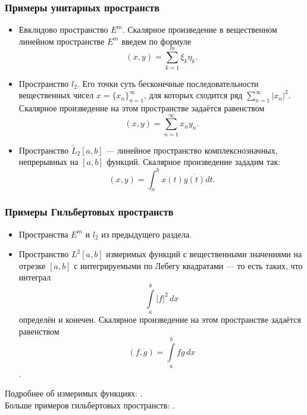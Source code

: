\subsubsection*{Примеры унитарных пространств}
\begin{itemize}
	\itemsep0pt
	\item Евклидово пространство $E^m$. Скалярное произведение в вещественном линейном пространстве $E^m$ введем по формуле
	$$(x, y) = \sum_{k = 1}^{m}\xi_k\eta_k.$$
	\item Пространство $l_2$. Его точки суть бесконечные последовательности вещественных чисел $x = \{x_n\}_{n=1}^{\infty}$, для которых сходится ряд $\sum_{n=1}^\infty |x_n|^2$. Скалярное произведение на этом пространстве задаётся равенством
	$$(x, y) = \sum_{n=1}^\infty x_n y_n.$$
	\item Пространство $\tilde{L}_2[a, b]$ --- линейное пространство комплекснозначных, непрерывных на $[a, b]$ функций. Скалярное произведение зададим так:
	$$(x, y) = \int_{a}^{b}x(t)\overline{y(t)} dt.$$
\end{itemize}

\subsubsection*{Примеры Гильбертовых пространств}
\begin{itemize}
	\itemsep0pt
	\item Пространства $E^m$ и $l_2$ из предыдущего раздела.
	\item Пространство $L^2[a,b]$ измеримых функций с вещественными значениями на отрезке $[a,b]$ с интегрируемыми по Лебегу квадратами --- то есть таких, что интеграл
	$$\int\limits_a^b|f|^2\,dx$$
	определён и конечен. Скалярное произведение на этом пространстве задаётся равенством
	$$(f, g) = \int\limits_a^bf{g}\,dx$$.
\end{itemize}
Подробнее об измеримых функциях: \cite{measurable-function}.\\
Больше примеров гильбертовых пространств: \cite{hilbert-spaces}.